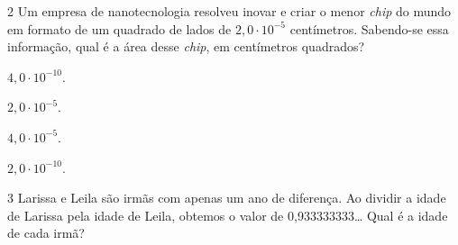 


\num{2} Um empresa de nanotecnologia resolveu inovar e criar o menor \textit{chip} do
mundo em formato de um quadrado de lados de $2,0 \cdot 10^{-5}$ centímetros.
Sabendo-se essa informação, qual é a área desse \textit{chip}, em centímetros quadrados?

\begin{escolha}
\item $4,0 \cdot 10^{-10}$.
\item $2,0 \cdot 10^{-5}$.
\item $4,0 \cdot 10^{-5}$.
\item $2,0 \cdot 10^{-10}$.
\end{escolha}












\num{3} Larissa e Leila são irmãs com apenas um ano de diferença. Ao dividir a
idade de Larissa pela idade de Leila, obtemos o valor de
0,933333333\ldots{} Qual é a idade de cada irmã?

